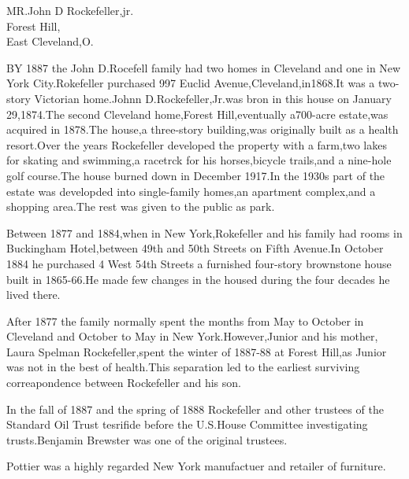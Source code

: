 \documentclass[11pt, oneside]{letter}   	%
\begin{document}
\begin{letter}{}%

\setlength{\parindent}{0cm}

\opening{MR.John D Rockefeller,jr.\\Forest Hill,\\East Cleveland,O.}

\setlength{\parindent}{0.5cm}
BY 1887 the John D.Rocefell family had two homes in Cleveland and one in New York City.Rokefeller purchased 997 Euclid Avenue,Cleveland,in1868.It was a two-story Victorian home.Johnn D.Rockefeller,Jr.was bron in this house on January 29,1874.The second Cleveland home,Forest Hill,eventually a700-acre estate,was acquired in 1878.The house,a three-story building,was originally built as a health resort.Over the years Rockefeller developed the property with a farm,two lakes for skating and swimming,a racetrck for his horses,bicycle trails,and a nine-hole golf course.The house burned down in December 1917.In the 1930s part of the estate was developded into single-family homes,an apartment complex,and a shopping area.The rest was given to the public as park.

Between 1877 and 1884,when in New York,Rokefeller and his family had rooms in Buckingham Hotel,between 49th and 50th Streets on Fifth Avenue.In October 1884 he purchased 4 West 54th Streets a furnished four-story brownstone house built in 1865-66.He made few changes in the housed during the four decades he lived there.

After 1877 the family normally spent the months from May to October in Cleveland and October to May in New York.However,Junior and his mother, Laura Spelman Rockefeller,spent the winter of 1887-88 at Forest Hill,as Junior was not in the best of health.This separation led to the earliest surviving correapondence between Rockefeller and his son.

In the fall of 1887 and the spring of 1888 Rockefeller and other trustees of the Standard Oil Trust tesrifide before the U.S.House Committee investigating trusts.Benjamin Brewster was one of the original trustees.

Pottier was a highly regarded New York manufactuer and retailer of furniture.

\end{letter}
\end{document}
